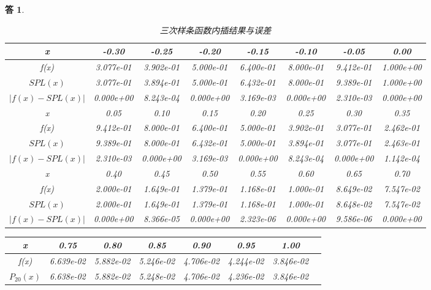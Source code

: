 \documentclass[10pt]{ctexart}
\newtheorem*{answer}{答}
\begin{document}
\begin{answer}
\begin{table}[H]
\begin{tabular}{cccccccc}
            \bottomrule
            \toprule
            x & -0.30 & -0.25 & -0.20 & -0.15 & -0.10 & -0.05 & 0.00 \\
            \midrule
            f(x) &  3.077e-01 & 3.902e-01  & 5.000e-01 & 6.400e-01 & 8.000e-01 & 9.412e-01 & 1.000e+00 \\
            $SPL(x)$ &  3.077e-01 & 3.894e-01 & 5.000e-01 & 6.432e-01 & 8.000e-01 & 9.389e-01 &  1.000e+00  \\
            $\lvert f(x)-SPL(x)\rvert$ & 0.000e+00 & 8.243e-04& 0.000e+00 &  3.169e-03 & 0.000e+00 & 2.310e-03 & 0.000e+00\\
            \bottomrule
            \toprule
            x & 0.05 & 0.10 & 0.15 & 0.20 & 0.25 & 0.30 & 0.35 \\
            \midrule
            f(x) &  9.412e-01 & 8.000e-01  & 6.400e-01 & 5.000e-01 & 3.902e-01 & 3.077e-01 & 2.462e-01 \\
            $SPL(x)$ &  9.389e-01 & 8.000e-01& 6.432e-01 & 5.000e-01 & 3.894e-01 & 3.077e-01 & 2.463e-01\\
            $\lvert f(x)-SPL(x)\rvert$ & 2.310e-03 & 0.000e+00 & 3.169e-03 & 0.000e+00 & 8.243e-04 & 0.000e+00 & 1.142e-04\\
            \bottomrule
            \toprule
            x & 0.40 & 0.45 & 0.50 & 0.55 & 0.60 & 0.65 & 0.70 \\
            \midrule
            f(x) &  2.000e-01 & 1.649e-01  & 1.379e-01& 1.168e-01  &  1.000e-01 &8.649e-02 &7.547e-02\\
            $SPL(x)$ &  2.000e-01 & 1.649e-01 & 1.379e-01 & 1.168e-01 & 1.000e-01 & 8.648e-02 & 7.547e-02\\
            $\lvert f(x)-SPL(x)\rvert$ & 0.000e+00 & 8.366e-05 & 0.000e+00 & 2.323e-06 & 0.000e+00 & 9.586e-06 & 0.000e+00\\
            \bottomrule
        \end{tabular}
        \caption{三次样条函数内插结果与误差}
    \end{table}
    \begin{table}
        \centering
        \begin{tabular}{cccccccc}
            \toprule
            x & 0.75 & 0.80 & 0.85 & 0.90 & 0.95 & 1.00\\
            \midrule
            f(x) &  6.639e-02 & 5.882e-02  & 5.246e-02&  4.706e-02  &  4.244e-02 &3.846e-02&\\
            $P_{20}(x)$ &  6.638e-02 & 5.882e-02 & 5.248e-02 & 4.706e-02 & 4.236e-02 & 3.846e-02 &\\

\end{tabular}
\end{table}
\end{answer}
\end{document}
